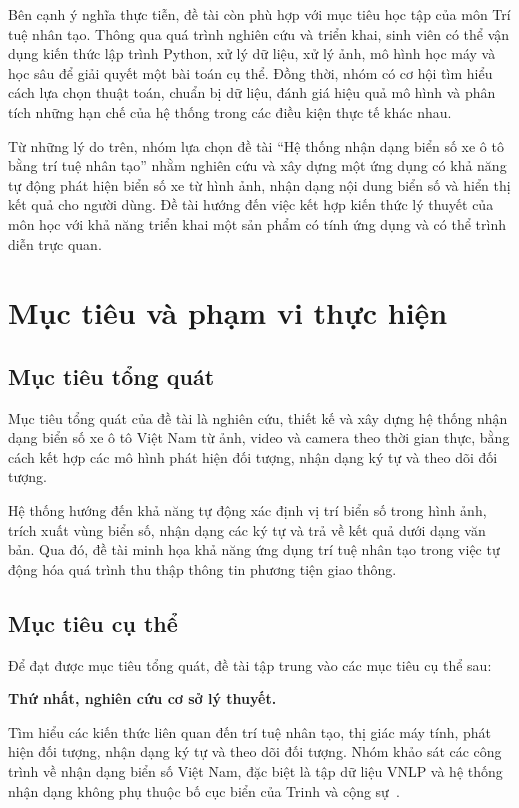 Bên cạnh ý nghĩa thực tiễn, đề tài còn phù hợp với mục tiêu học tập của môn Trí tuệ nhân tạo. Thông qua quá trình nghiên cứu và triển khai, sinh viên có thể vận dụng kiến thức lập trình Python, xử lý dữ liệu, xử lý ảnh, mô hình học máy và học sâu để giải quyết một bài toán cụ thể. Đồng thời, nhóm có cơ hội tìm hiểu cách lựa chọn thuật toán, chuẩn bị dữ liệu, đánh giá hiệu quả mô hình và phân tích những hạn chế của hệ thống trong các điều kiện thực tế khác nhau.

Từ những lý do trên, nhóm lựa chọn đề tài “Hệ thống nhận dạng biển số xe ô tô bằng trí tuệ nhân tạo” nhằm nghiên cứu và xây dựng một ứng dụng có khả năng tự động phát hiện biển số xe từ hình ảnh, nhận dạng nội dung biển số và hiển thị kết quả cho người dùng. Đề tài hướng đến việc kết hợp kiến thức lý thuyết của môn học với khả năng triển khai một sản phẩm có tính ứng dụng và có thể trình diễn trực quan.

\section{Mục tiêu và phạm vi thực hiện}

\subsection{Mục tiêu tổng quát}

Mục tiêu tổng quát của đề tài là nghiên cứu, thiết kế và xây dựng hệ thống nhận dạng biển số xe ô tô Việt Nam từ ảnh, video và camera theo thời gian thực, bằng cách kết hợp các mô hình phát hiện đối tượng, nhận dạng ký tự và theo dõi đối tượng.

Hệ thống hướng đến khả năng tự động xác định vị trí biển số trong hình ảnh, trích xuất vùng biển số, nhận dạng các ký tự và trả về kết quả dưới dạng văn bản. Qua đó, đề tài minh họa khả năng ứng dụng trí tuệ nhân tạo trong việc tự động hóa quá trình thu thập thông tin phương tiện giao thông.

\subsection{Mục tiêu cụ thể}

Để đạt được mục tiêu tổng quát, đề tài tập trung vào các mục tiêu cụ thể sau:

\noindent\textbf{Thứ nhất, nghiên cứu cơ sở lý thuyết.}
\nopagebreak

Tìm hiểu các kiến thức liên quan đến trí tuệ nhân tạo, thị giác máy tính, phát hiện đối tượng, nhận dạng ký tự và theo dõi đối tượng. Nhóm khảo sát các công trình về nhận dạng biển số Việt Nam, đặc biệt là tập dữ liệu VNLP và hệ thống nhận dạng không phụ thuộc bố cục biển của Trinh và cộng sự~\cite{trinh2022}.

